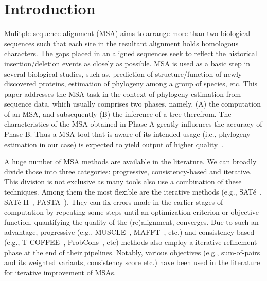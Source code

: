 \section{Introduction}
\label{sec:intro}
Mulitple sequence alignment (MSA) aims to arrange more than two biological sequences such that each site in the resultant alignment holds homologous characters. The gaps placed in an aligned sequences seek to reflect the historical insertion/deletion events as closely as possible. MSA is used as a basic step in several biological studies, such as, prediction of structure/function of newly discovered proteins, estimation of phylogeny among a group of species, etc. This paper addresses the MSA task in the context of phylogeny estimation from sequence data, which usually comprises two phases, namely, (A) the computation of an MSA, and subsequently (B) the inference of a tree therefrom. The characteristics of the MSA obtained in Phase A greatly influences the accuracy of Phase B. Thus a MSA tool that is aware of its intended usage (i.e., phylogeny estimation in our case) is expected to yield output of higher quality~\cite{nayeem2020multiobjective, nayeem2019phylogeny}.  

A huge number of MSA methods are available in the literature. We can broadly divide those into three categories: progressive, consistency-based  and iterative. This division is not exclusive as many tools also use a combination of these techniques. Among them the most flexible are the iterative methods (e.g., SAT\'e~\cite{liu2009rapid}, SAT\'e-II~\cite{liu2012sate}, PASTA~\cite{mirarab2015pasta}). They can fix errors made in the earlier stages of computation by repeating some steps until an optimization criterion or objective function, quantifying the quality of the (re)alignment, converges. Due to such an advantage, progressive (e.g., MUSCLE~\cite{edgar2004muscle}, MAFFT~\cite{katoh2002mafft}, etc.) and consistency-based (e.g., T-COFFEE~\cite{notredame2000t}, ProbCons~\cite{do2005probcons}, etc) methods also employ a iterative refinement phase at the end of their pipelines. Notably, various objectives (e.g., sum-of-pairs and its weighted variants, consistency score etc.) have been used in the literature for iterative improvement of MSAs. 

